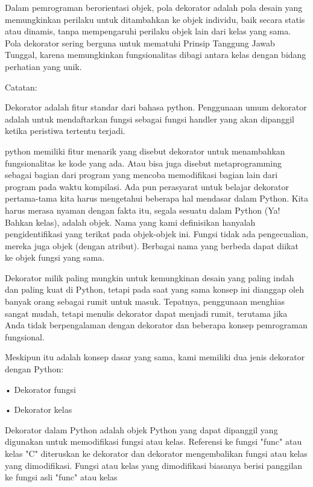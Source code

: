 \documentclass[12pt,a4paper]{article}
\begin{document}
Dalam pemrograman berorientasi objek, pola dekorator adalah pola desain yang memungkinkan perilaku untuk ditambahkan ke objek individu, baik secara statis atau dinamis, tanpa mempengaruhi perilaku objek lain dari kelas yang sama. Pola dekorator sering berguna untuk mematuhi Prinsip Tanggung Jawab Tunggal, karena memungkinkan fungsionalitas dibagi antara kelas dengan bidang perhatian yang unik.



Catatan:

Dekorator adalah fitur standar dari bahasa python. Penggunaan umum dekorator adalah untuk mendaftarkan fungsi sebagai fungsi handler yang akan dipanggil ketika peristiwa tertentu terjadi.



python memiliki fitur menarik yang disebut dekorator untuk menambahkan fungsionalitas ke kode yang ada. Atau bisa juga disebut metaprogramming sebagai bagian dari program yang mencoba memodifikasi bagian lain dari program pada waktu kompilasi. Ada pun perasyarat untuk belajar dekorator pertama-tama kita harus mengetahui beberapa hal mendasar dalam Python. Kita harus merasa nyaman dengan fakta itu, segala sesuatu dalam Python (Ya! Bahkan kelas), adalah objek. Nama yang kami definisikan hanyalah pengidentifikasi yang terikat pada objek-objek ini. Fungsi tidak ada pengecualian, mereka juga objek (dengan atribut). Berbagai nama yang berbeda dapat diikat ke objek fungsi yang sama.



Dekorator milik paling mungkin untuk kemungkinan desain yang paling indah dan paling kuat di Python, tetapi pada saat yang sama konsep ini dianggap oleh banyak orang sebagai rumit untuk masuk. Tepatnya, penggunaan menghias sangat mudah, tetapi menulis dekorator dapat menjadi rumit, terutama jika Anda tidak berpengalaman dengan dekorator dan beberapa konsep pemrograman fungsional. 



Meskipun itu adalah konsep dasar yang sama, kami memiliki dua jenis dekorator dengan Python:

•	Dekorator fungsi

•	Dekorator kelas

Dekorator dalam Python adalah objek Python yang dapat dipanggil yang digunakan untuk memodifikasi fungsi atau kelas. Referensi ke fungsi "func" atau kelas "C" diteruskan ke dekorator dan dekorator mengembalikan fungsi atau kelas yang dimodifikasi. Fungsi atau kelas yang dimodifikasi biasanya berisi panggilan ke fungsi asli "func" atau kelas 
\end{document}
